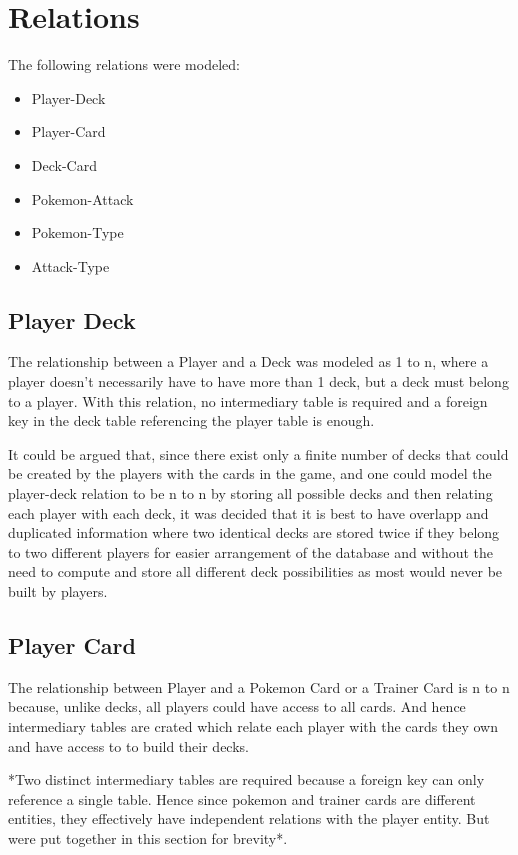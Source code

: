 \documentclass{article}
\begin{document}
\section{Relations}

The following relations were modeled:

\begin{itemize}
    \item Player-Deck
    \item Player-Card
    \item Deck-Card
    \item Pokemon-Attack
    \item Pokemon-Type
    \item Attack-Type
\end{itemize}

\subsection{Player Deck}

The relationship between a Player and a Deck was 
modeled as 1 to n, where a player doesn't necessarily have to have more than 1 
deck, but a deck must belong to a player. With this relation, no intermediary 
table is required and a foreign key in the deck table referencing the player 
table is enough.

It could be argued that, since there exist only a finite number of decks that 
could be created by the players with the cards in the game, and one could 
model the player-deck relation to be n to n by storing all possible decks and 
then relating each player with each deck, it was decided that it is best to 
have overlapp and duplicated information where two identical decks are stored 
twice if they belong to two different players for easier arrangement of the 
database and without the need to compute and store all different deck 
possibilities as most would never be built by players.

\subsection{Player Card}

The relationship between Player and a 
Pokemon Card or a Trainer Card is n to n 
because, unlike decks, all players could have access to all cards. And hence 
intermediary tables are crated which relate each player with the cards they 
own and have access to to build their decks. 

*Two distinct intermediary tables are required because a foreign key can only 
reference a single table. Hence since pokemon and trainer cards are different 
entities, they effectively have independent relations with the player entity. 
But were put together in this section for brevity*.
\end{document}
